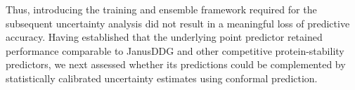 \documentclass[11pt]{article}
\begin{document}
Thus, introducing the training and ensemble framework required for the subsequent uncertainty analysis did not result in a meaningful loss of predictive accuracy. Having established that the underlying point predictor retained performance comparable to JanusDDG and other competitive protein-stability predictors, we next assessed whether its predictions could be complemented by statistically calibrated uncertainty estimates using conformal prediction.





\end{document}
